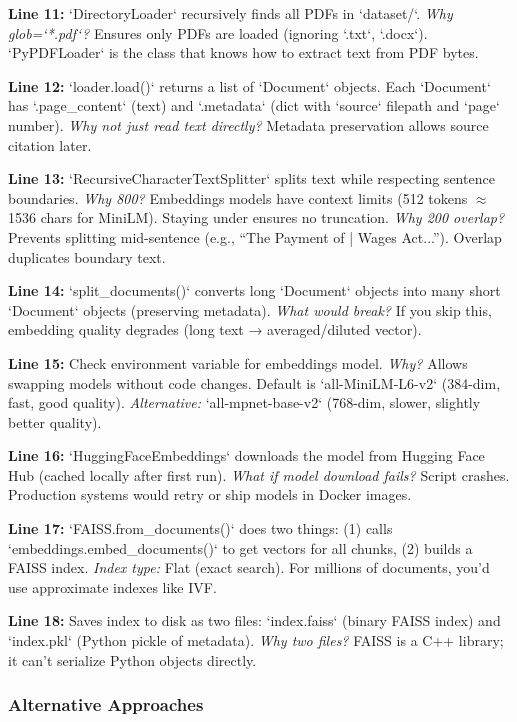 \documentclass[11pt,a4paper]{article}
\begin{document}
\textbf{Line 11:} `DirectoryLoader` recursively finds all PDFs in `dataset/`. \textit{Why glob=`*.pdf`?} Ensures only PDFs are loaded (ignoring `.txt`, `.docx`). `PyPDFLoader` is the class that knows how to extract text from PDF bytes.

\textbf{Line 12:} `loader.load()` returns a list of `Document` objects. Each `Document` has `.page\_content` (text) and `.metadata` (dict with `source` filepath and `page` number). \textit{Why not just read text directly?} Metadata preservation allows source citation later.

\textbf{Line 13:} `RecursiveCharacterTextSplitter` splits text while respecting sentence boundaries. \textit{Why 800?} Embeddings models have context limits (512 tokens $\approx$ 1536 chars for MiniLM). Staying under ensures no truncation. \textit{Why 200 overlap?} Prevents splitting mid-sentence (e.g., ``The Payment of | Wages Act...''). Overlap duplicates boundary text.

\textbf{Line 14:} `split\_documents()` converts long `Document` objects into many short `Document` objects (preserving metadata). \textit{What would break?} If you skip this, embedding quality degrades (long text → averaged/diluted vector).

\textbf{Line 15:} Check environment variable for embeddings model. \textit{Why?} Allows swapping models without code changes. Default is `all-MiniLM-L6-v2` (384-dim, fast, good quality). \textit{Alternative:} `all-mpnet-base-v2` (768-dim, slower, slightly better quality).

\textbf{Line 16:} `HuggingFaceEmbeddings` downloads the model from Hugging Face Hub (cached locally after first run). \textit{What if model download fails?} Script crashes. Production systems would retry or ship models in Docker images.

\textbf{Line 17:} `FAISS.from\_documents()` does two things: (1) calls `embeddings.embed\_documents()` to get vectors for all chunks, (2) builds a FAISS index. \textit{Index type:} Flat (exact search). For millions of documents, you'd use approximate indexes like IVF.

\textbf{Line 18:} Saves index to disk as two files: `index.faiss` (binary FAISS index) and `index.pkl` (Python pickle of metadata). \textit{Why two files?} FAISS is a C++ library; it can't serialize Python objects directly.

\subsubsection{Alternative Approaches}
\end{document}
